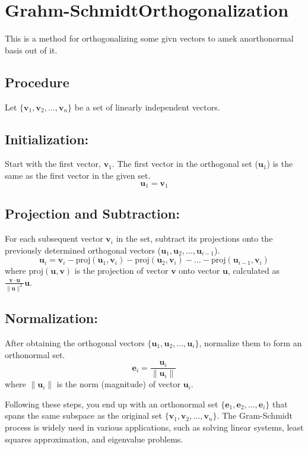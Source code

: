 \section{Grahm-SchmidtOrthogonalization}

This is a method for orthogonalizing some givn vectors to amek anorthonormal basis out of it. 

\subsection{Procedure}

Let $\{ \mathbf{v}_1, \mathbf{v}_2, \ldots, \mathbf{v}_n \}$ be a set of linearly independent vectors.

\subsection*{Initialization:}
Start with the first vector, $\mathbf{v}_1$. The first vector in the orthogonal set ($\mathbf{u}_1$) is the same as the first vector in the given set.
\[
\mathbf{u}_1 = \mathbf{v}_1
\]

\subsection*{Projection and Subtraction:}
For each subsequent vector $\mathbf{v}_i$ in the set, subtract its projections onto the previously determined orthogonal vectors ($\mathbf{u}_1, \mathbf{u}_2, \ldots, \mathbf{u}_{i-1}$).
\[
\mathbf{u}_i = \mathbf{v}_i - \text{proj}(\mathbf{u}_1, \mathbf{v}_i) - \text{proj}(\mathbf{u}_2, \mathbf{v}_i) - \ldots - \text{proj}(\mathbf{u}_{i-1}, \mathbf{v}_i)
\]
where $\text{proj}(\mathbf{u}, \mathbf{v})$ is the projection of vector $\mathbf{v}$ onto vector $\mathbf{u}$, calculated as $\frac{\mathbf{v} \cdot \mathbf{u}}{\|\mathbf{u}\|^2} \mathbf{u}$.

\subsection*{Normalization:}
After obtaining the orthogonal vectors $\{\mathbf{u}_1, \mathbf{u}_2, \ldots, \mathbf{u}_i\}$, normalize them to form an orthonormal set.
\[
\mathbf{e}_i = \frac{\mathbf{u}_i}{\|\mathbf{u}_i\|}
\]
where $\|\mathbf{u}_i\|$ is the norm (magnitude) of vector $\mathbf{u}_i$.

Following these steps, you end up with an orthonormal set $\{\mathbf{e}_1, \mathbf{e}_2, \ldots, \mathbf{e}_i\}$ that spans the same subspace as the original set $\{\mathbf{v}_1, \mathbf{v}_2, \ldots, \mathbf{v}_n\}$. The Gram-Schmidt process is widely used in various applications, such as solving linear systems, least squares approximation, and eigenvalue problems.


